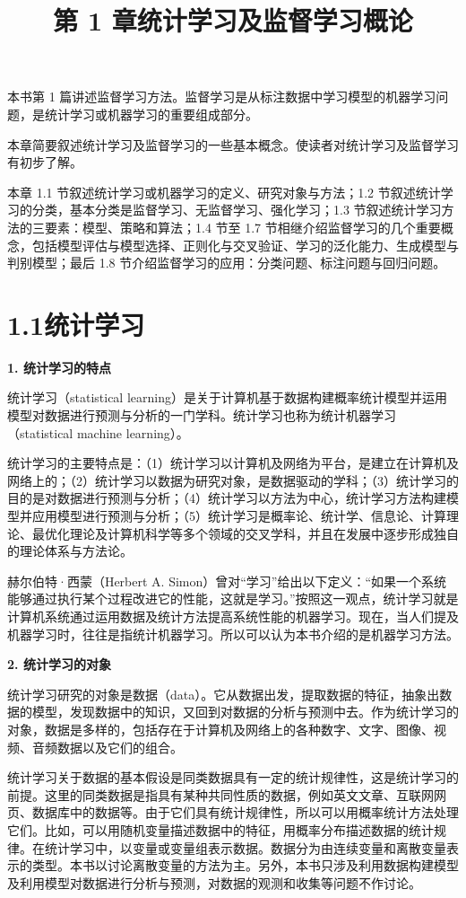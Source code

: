 \documentclass[UTF8, 12pt, fontset=fandol, oneside]{ctexart}
\title{第 1 章\quad 统计学习及监督学习概论}
\author{}
\date{}
\begin{document}
\maketitle

本书第 1 篇讲述监督学习方法。监督学习是从标注数据中学习模型的机器学习问题，是统计学习或机器学习的重要组成部分。

本章简要叙述统计学习及监督学习的一些基本概念。使读者对统计学习及监督学习有初步了解。

本章 1.1 节叙述统计学习或机器学习的定义、研究对象与方法；1.2 节叙述统计学习的分类，基本分类是监督学习、无监督学习、强化学习；1.3 节叙述统计学习方法的三要素：模型、策略和算法；1.4 节至 1.7 节相继介绍监督学习的几个重要概念，包括模型评估与模型选择、正则化与交叉验证、学习的泛化能力、生成模型与判别模型；最后 1.8 节介绍监督学习的应用：分类问题、标注问题与回归问题。

\section*{1.1\quad 统计学习}

\noindent\textbf{1. 统计学习的特点}

统计学习（statistical learning）是关于计算机基于数据构建概率统计模型并运用模型对数据进行预测与分析的一门学科。统计学习也称为统计机器学习（statistical machine learning）。

统计学习的主要特点是：（1）统计学习以计算机及网络为平台，是建立在计算机及网络上的；（2）统计学习以数据为研究对象，是数据驱动的学科；（3）统计学习的目的是对数据进行预测与分析；（4）统计学习以方法为中心，统计学习方法构建模型并应用模型进行预测与分析；（5）统计学习是概率论、统计学、信息论、计算理论、最优化理论及计算机科学等多个领域的交叉学科，并且在发展中逐步形成独自的理论体系与方法论。

赫尔伯特·西蒙（Herbert A. Simon）曾对“学习”给出以下定义：“如果一个系统能够通过执行某个过程改进它的性能，这就是学习。”按照这一观点，统计学习就是计算机系统通过运用数据及统计方法提高系统性能的机器学习。现在，当人们提及机器学习时，往往是指统计机器学习。所以可以认为本书介绍的是机器学习方法。

\noindent\textbf{2. 统计学习的对象}

统计学习研究的对象是数据（data）。它从数据出发，提取数据的特征，抽象出数据的模型，发现数据中的知识，又回到对数据的分析与预测中去。作为统计学习的对象，数据是多样的，包括存在于计算机及网络上的各种数字、文字、图像、视频、音频数据以及它们的组合。

统计学习关于数据的基本假设是同类数据具有一定的统计规律性，这是统计学习的前提。这里的同类数据是指具有某种共同性质的数据，例如英文文章、互联网网页、数据库中的数据等。由于它们具有统计规律性，所以可以用概率统计方法处理它们。比如，可以用随机变量描述数据中的特征，用概率分布描述数据的统计规律。在统计学习中，以变量或变量组表示数据。数据分为由连续变量和离散变量表示的类型。本书以讨论离散变量的方法为主。另外，本书只涉及利用数据构建模型及利用模型对数据进行分析与预测，对数据的观测和收集等问题不作讨论。
\end{document}
